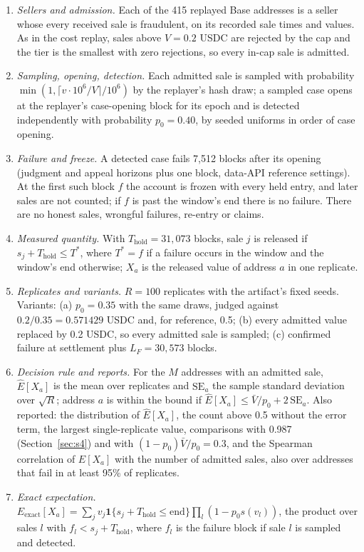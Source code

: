 \documentclass[10pt,a4paper]{article}
\newcommand{\Thold}{T_{\mathrm{hold}}}
\newcommand{\one}{\mathbf{1}}
\theoremstyle{plain}
\theoremstyle{remark}
\begin{document}
\begin{enumerate}
\item \emph{Sellers and admission.} Each of the 415 replayed Base addresses is a seller whose every received sale is fraudulent, on its recorded sale times and values. As in the cost replay, sales above $V=0.2$ USDC are rejected by the cap and the tier is the smallest with zero rejections, so every in-cap sale is admitted.
\item \emph{Sampling, opening, detection.} Each admitted sale is sampled with probability $\min(1,\lceil v\cdot10^6/V\rceil/10^6)$ by the replayer's hash draw; a sampled case opens at the replayer's case-opening block for its epoch and is detected independently with probability $p_0=0.40$, by seeded uniforms in order of case opening.
\item \emph{Failure and freeze.} A detected case fails 7,512 blocks after its opening (judgment and appeal horizons plus one block, data-API reference settings). At the first such block $f$ the account is frozen with every held entry, and later sales are not counted; if $f$ is past the window's end there is no failure. There are no honest sales, wrongful failures, re-entry or claims.
\item \emph{Measured quantity.} With $\Thold=31{,}073$ blocks, sale $j$ is released if $s_j+\Thold\le T^*$, where $T^*=f$ if a failure occurs in the window and the window's end otherwise; $X_a$ is the released value of address $a$ in one replicate.
\item \emph{Replicates and variants.} $R=100$ replicates with the artifact's fixed seeds. Variants: (a) $p_0=0.35$ with the same draws, judged against $0.2/0.35=0.571429$ USDC and, for reference, 0.5; (b) every admitted value replaced by 0.2 USDC, so every admitted sale is sampled; (c) confirmed failure at settlement plus $L_F=30{,}573$ blocks.
\item \emph{Decision rule and reports.} For the $M$ addresses with an admitted sale, $\hat E[X_a]$ is the mean over replicates and $\mathrm{SE}_a$ the sample standard deviation over $\sqrt R$; address $a$ is within the bound if $\hat E[X_a]\le\bar V/p_0+2\,\mathrm{SE}_a$. Also reported: the distribution of $\hat E[X_a]$, the count above 0.5 without the error term, the largest single-replicate value, comparisons with 0.987 (Section~\ref{sec:s4}) and with $(1-p_0)\bar V/p_0=0.3$, and the Spearman correlation of $\hat E[X_a]$ with the number of admitted sales, also over addresses that fail in at least 95\% of replicates.
\item \emph{Exact expectation.} $E_{\mathrm{exact}}[X_a]=\sum_jv_j\one\{s_j+\Thold\le\text{end}\}\prod_{l}(1-p_0s(v_l))$, the product over sales $l$ with $f_l<s_j+\Thold$, where $f_l$ is the failure block if sale $l$ is sampled and detected.


\end{enumerate}
\end{document}
